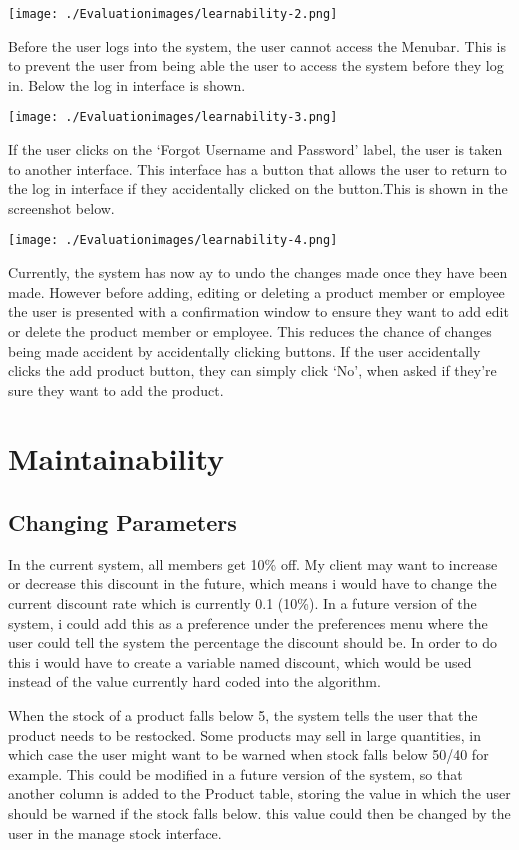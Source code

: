 \texttt{[image: ./Evaluationimages/learnability-2.png]}

Before the user logs into the system, the user cannot access the Menubar. This is to prevent the user from being able the user to access the system before they log in. Below the log in interface is shown.

\texttt{[image: ./Evaluationimages/learnability-3.png]}

If the user clicks on the `Forgot Username and Password' label, the user is taken to another interface. This interface has a button that allows the user to return to the log in interface if they accidentally clicked on the button.This is shown in the screenshot below.

\texttt{[image: ./Evaluationimages/learnability-4.png]}

Currently, the system has now ay to undo the changes made once they have been made. However before adding, editing or deleting a product member or employee the user is presented with a confirmation window to ensure they want to add edit or delete the product member or employee. This reduces the chance of changes being made accident by accidentally clicking buttons. If the user accidentally clicks the add product button, they can simply click `No', when asked if they're sure they want to add the product.

\pagebreak
\section{Maintainability}

\subsection{Changing Parameters}

In the current system, all members get 10\% off. My client may want to increase or decrease this discount in the future, which means i would have to change the current discount rate which is currently 0.1 (10\%). In a future version of the system, i could add this as a preference under the preferences menu where the user could tell the system the percentage the discount should be. In order to do this i would have to create a variable named discount, which would be used instead of the value currently hard coded into the algorithm.

When the stock of a product falls below 5, the system tells the user that the product needs to be restocked. Some products may sell in large quantities, in which case the user might want to be warned when stock falls below 50/40 for example. This could be modified in a future version of the system, so that another column is added to the Product table, storing the value in which the user should be warned if the stock falls below. this value could then be changed by the user in the manage stock interface.

